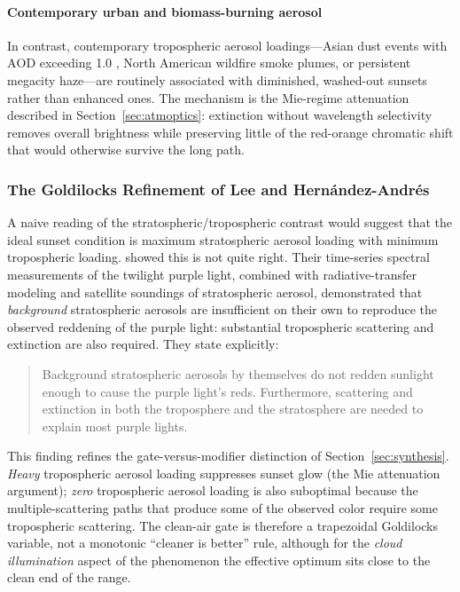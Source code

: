 \documentclass[11pt,a4paper]{article}
\newcommand{\AOD}{\text{AOD}}
\begin{document}
\paragraph{Contemporary urban and biomass-burning aerosol} In contrast, contemporary tropospheric aerosol loadings---Asian dust events with $\AOD$ exceeding 1.0 \citep{husar2000asian}, North American wildfire smoke plumes, or persistent megacity haze---are routinely associated with diminished, washed-out sunsets rather than enhanced ones. The mechanism is the Mie-regime attenuation described in Section~\ref{sec:atmoptics}: extinction without wavelength selectivity removes overall brightness while preserving little of the red-orange chromatic shift that would otherwise survive the long path.

\subsubsection{The Goldilocks Refinement of Lee and Hern\'andez-Andr\'es}

A naive reading of the stratospheric/tropospheric contrast would suggest that the ideal sunset condition is maximum stratospheric aerosol loading with minimum tropospheric loading. \citet{lee2003purple} showed this is not quite right. Their time-series spectral measurements of the twilight purple light, combined with radiative-transfer modeling and satellite soundings of stratospheric aerosol, demonstrated that \emph{background} stratospheric aerosols are insufficient on their own to reproduce the observed reddening of the purple light: substantial tropospheric scattering and extinction are also required. They state explicitly:
\begin{quote}
Background stratospheric aerosols by themselves do not redden sunlight enough to cause the purple light's reds. Furthermore, scattering and extinction in both the troposphere and the stratosphere are needed to explain most purple lights.
\end{quote}

This finding refines the gate-versus-modifier distinction of Section~\ref{sec:synthesis}. \emph{Heavy} tropospheric aerosol loading suppresses sunset glow (the Mie attenuation argument); \emph{zero} tropospheric aerosol loading is also suboptimal because the multiple-scattering paths that produce some of the observed color require some tropospheric scattering. The clean-air gate is therefore a trapezoidal Goldilocks variable, not a monotonic ``cleaner is better'' rule, although for the \emph{cloud illumination} aspect of the phenomenon the effective optimum sits close to the clean end of the range.
\end{document}
